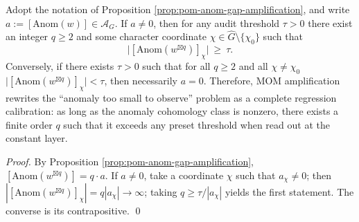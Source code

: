 \begin{corollary}\label{cor:pom-anom-gap-amplification-completeness}
Adopt the notation of Proposition \ref{prop:pom-anom-gap-amplification}, and write
\(
a:=[\mathrm{Anom}(w)]\in\mathcal{A}_G
\).
If \(a\neq 0\), then for any audit threshold \(\tau>0\) there exist an integer \(q\ge 2\) and some character coordinate \(\chi\in\widehat G\setminus\{\chi_0\}\) such that
\[
\bigl|[\mathrm{Anom}(w^{\boxtimes q})]_{\chi}\bigr|\ \ge\ \tau.
\]
Conversely, if there exists \(\tau>0\) such that for all \(q\ge 2\) and all \(\chi\neq\chi_0\)
\(
\bigl|[\mathrm{Anom}(w^{\boxtimes q})]_{\chi}\bigr|<\tau
\),
then necessarily \(a=0\).
Therefore, MOM amplification rewrites the ``anomaly too small to observe'' problem as a complete regression calibration: as long as the anomaly cohomology class is nonzero, there exists a finite order \(q\) such that it exceeds any preset threshold when read out at the constant layer.
\end{corollary}
\begin{proof}
By Proposition \ref{prop:pom-anom-gap-amplification},
\(
[\mathrm{Anom}(w^{\boxtimes q})]=q\cdot a
\).
If \(a\neq 0\), take a coordinate \(\chi\) such that \(a_\chi\neq 0\); then
\(
|[\mathrm{Anom}(w^{\boxtimes q})]_\chi|
=q|a_\chi|
\to\infty
\);
taking \(q\ge \tau/|a_\chi|\) yields the first statement.
The converse is its contrapositive. \qed
\end{proof}

